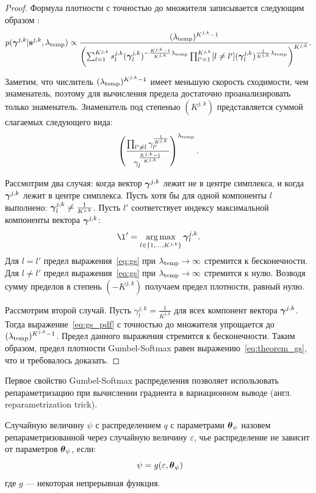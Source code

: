 \begin{proof} 
Формула плотности с точностью до множителя записывается следующим образом :
\begin{equation}
\label{eq:pdf_proof}
    p(\boldsymbol{\gamma}^{j,k}|\mathbf{s}^{j,k}, \lambda_{\text{temp}}) \propto    \frac{(\lambda_{\text{temp}})^{K^{j,k}-1}}{\left(\sum_{l=1}^{K^{j,k}} s^{j,k}_l(\boldsymbol{\gamma}^{j,k}_l)^{-\frac{K^{j,k}-1}{K^{j,k}}\lambda_{\text{temp}}}\prod_{l'=1}^{K^{j,k}} [l \neq l'](\boldsymbol{\gamma}_l^{j,k})^{\frac{1}{K^{j,k}}\lambda_{\text{temp}}}\right)^{K^{j,k}}}.
\end{equation}

Заметим, что числитель $(\lambda_{\text{temp}})^{K^{j,k}-1}$ имеет меньшую скорость сходимости, чем знаменатель, поэтому для вычисления предела достаточно проанализировать только знаменатель. Знаменатель под степенью $(K^{j,k})$ представляется суммой слагаемых следующего вида: 
\begin{equation}
\label{eq:gs}
    \left(\frac{\prod_{l' \neq l} \gamma_{l'}^{\frac{1}{K^{j,k}}}}{\gamma_l^{\frac{K^{j,k}-1}{K^{j,k}}}}\right)^{\lambda_{\text{temp}}}.
\end{equation}

Рассмотрим два случая: когда вектор $\boldsymbol{\gamma}^{j,k}$  лежит не в центре симплекса, и когда  $\boldsymbol{\gamma}^{j,k}$ лежит в центре симплекса. 
Пусть хотя бы для одной компоненты $l$ выполнено: $\boldsymbol{\gamma}^{j,k}_l \neq \frac{1}{K^{j,k}}$. Пусть $l'$ соответствует индексу максимальной компоненты вектора $\boldsymbol{\gamma}^{j,k}$:
\[
    \l' = \argmax_{l \in \{1,\dots,K^{j,k}\}} \g^{j,k}_l.
\]
Для $l=l'$ предел выражения~\eqref{eq:gs} при $\lambda_{\text{temp}} \to \infty$ стремится к бесконечности. Для $l\neq l'$ предел выражения~\eqref{eq:gs} при $\lambda_{\text{temp}} \to \infty$ стремится к нулю. Возводя сумму пределов в степень $(-K^{j,k})$ получаем предел плотности, равный нулю.

Рассмотрим второй случай. Пусть ${\gamma}^{j,k}_l = \frac{1}{K^{j,k}}$ для всех компонент вектора $\boldsymbol{\gamma}^{j,k}$.
Тогда выражение~\eqref{eq:gs_pdf} с точностью до множителя упрощается до $(\lambda_{\text{temp}})^{K^{j,k}-1}$. Предел данного выражения стремится к бесконечности.
Таким образом, предел плотности Gumbel-Softmax равен выражению~\eqref{eq:theorem_gs}, что и требовалось доказать.

\end{proof}


Первое свойство Gumbel-Softmax распределения позволяет использовать репараметризацию при вычислении градиента в вариационном выводе (англ. reparametrization trick). 
\begin{defin} Случайную величину  $\psi$ с распределением $q$ с параметрами $\boldsymbol{\theta}_\psi$ назовем репараметризованной через случайную величину $\varepsilon$, чье распределение не зависит от параметров $\boldsymbol{\theta}_\psi$, если:
\[
   \psi = g(\varepsilon, \teta_\psi)
\]
где  $g$ --- некоторая непрерывная функция.
\end{defin}

